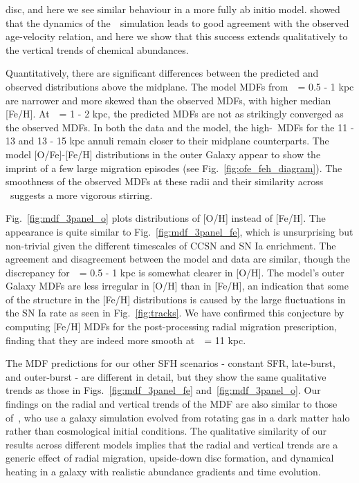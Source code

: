 \documentclass[draft2.tex]{subfiles}
\begin{document}
disc, and here we see similar behaviour in a more fully ab initio model. 
\citet{Bird2021} showed that the dynamics of the~\hsim~simulation leads to good 
agreement with the observed age-velocity relation, and here we show that 
this success extends qualitatively to the vertical trends of chemical 
abundances. 
\par 
Quantitatively, there are significant differences between the predicted and 
observed distributions above the midplane. 
The model MDFs from~\absz~= 0.5 - 1 kpc are narrower and more skewed than the 
observed MDFs, with higher median [Fe/H]. 
At~\absz~= 1 - 2 kpc, the predicted MDFs are not as strikingly converged as the 
observed MDFs. 
In both the data and the model, the high-\absz~MDFs for the 11 - 13 and 13 - 15 
kpc annuli remain closer to their midplane counterparts. 
The model [O/Fe]-[Fe/H] distributions in the outer Galaxy appear to show the 
imprint of a few large migration episodes (see Fig.~\ref{fig:ofe_feh_diagram}). 
The smoothness of the observed MDFs at these radii and their similarity across 
\absz~suggests a more vigorous stirring. 
\par 
Fig.~\ref{fig:mdf_3panel_o} plots distributions of [O/H] instead of [Fe/H]. 
The appearance is quite similar to Fig.~\ref{fig:mdf_3panel_fe}, which is 
unsurprising but non-trivial given the different timescales of CCSN and SN Ia 
enrichment. 
The agreement and disagreement between the model and data are similar, though 
the discrepancy for~\absz~= 0.5 - 1 kpc is somewhat clearer in [O/H]. 
The model's outer Galaxy MDFs are less irregular in [O/H] than in [Fe/H], an 
indication that some of the structure in the [Fe/H] distributions is caused by 
the large fluctuations in the SN Ia rate as seen in Fig.~\ref{fig:tracks}. 
We have confirmed this conjecture by computing [Fe/H] MDFs for the 
post-processing radial migration prescription, finding that they are indeed 
more smooth at~\rgal~= 11 kpc. 
\par 
The MDF predictions for our other SFH scenarios - constant SFR, late-burst, and 
outer-burst - are different in detail, but they show the same qualitative 
trends as those in Figs.~\ref{fig:mdf_3panel_fe} and~\ref{fig:mdf_3panel_o}. 
Our findings on the radial and vertical trends of the MDF are also similar 
to those of~\citet{Loebman2016}, who use a galaxy simulation evolved from 
rotating gas in a dark matter halo rather than cosmological initial conditions. 
The qualitative similarity of our results across different models implies that 
the radial and vertical trends are a generic effect of radial migration, 
upside-down disc formation, and dynamical heating in a galaxy with realistic 
abundance gradients and time evolution. 
\end{document}
